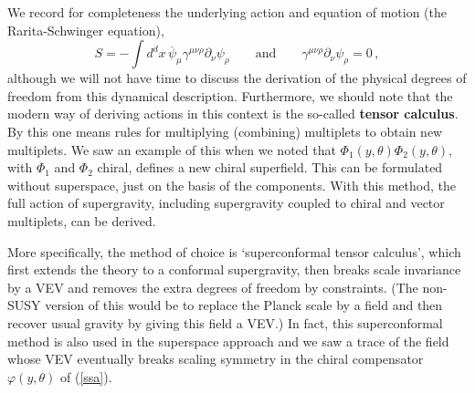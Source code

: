\documentclass[12pt]{article}
\newcommand{\be}{\begin{equation}}
\newcommand{\ee}{\end{equation}}
\newcommand{\ol}{\overline}
\numberwithin{equation}{section}
\begin{document}
We record for completeness the underlying action and equation of motion (the Rarita-Schwinger equation),
\be
S=-\int d^d x\,\ol{\psi}_\mu \gamma^{\mu\nu\rho}\partial_\nu\psi_\rho \qquad
\mbox{and} \qquad \gamma^{\mu\nu\rho}\partial_\nu\psi_\rho=0\,,
\ee
although we will not have time to discuss the derivation of the physical degrees of freedom from this dynamical description. Furthermore, we should note that the modern way of deriving actions in this context is the so-called {\bf tensor calculus}. By this one means rules for multiplying (combining) multiplets to obtain new multiplets. We saw an example of this when we noted that $\Phi_1(y,\theta)\Phi_2(y,\theta)$, with $\Phi_1$ and $\Phi_2$ chiral, defines a new chiral superfield. This can be formulated without superspace, just on the basis of the components. With this method, the full action of supergravity, including supergravity coupled to chiral and vector multiplets, can be derived. 

More specifically, the method of choice is `superconformal tensor calculus', which first extends the theory to a conformal supergravity, then breaks scale invariance by a VEV and removes the extra degrees of freedom by constraints. (The non-SUSY version of this would be to replace the Planck scale by a field and then recover usual gravity by giving this field a VEV.) In fact, this superconformal method is also used in the superspace approach and we saw a trace of the field whose VEV eventually breaks scaling symmetry in the chiral compensator $\varphi(y,\theta)$ of (\ref{ssa}).
\end{document}
